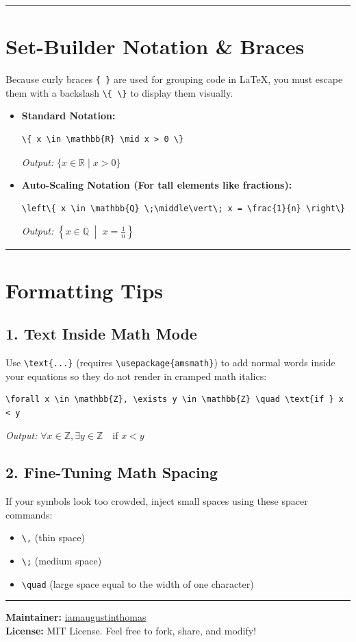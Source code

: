 \documentclass[11pt]{article}
\begin{document}
\vspace{1em}
\noindent\rule{\textwidth}{0.4pt}

\section*{\textbf{\Large Set-Builder Notation \& Braces}}
Because curly braces \verb|{ }| are used for grouping code in \LaTeX{}, you must escape them with a backslash \verb|\{ \}| to display them visually.

\begin{itemize}
    \item \textbf{Standard Notation:}
\begin{verbatim}
\{ x \in \mathbb{R} \mid x > 0 \}
\end{verbatim}
    \textit{Output:} $\{ x \in \mathbb{R} \mid x > 0 \}$

    \item \textbf{Auto-Scaling Notation (For tall elements like fractions):}
\begin{verbatim}
\left\{ x \in \mathbb{Q} \;\middle\vert\; x = \frac{1}{n} \right\}
\end{verbatim}
    \textit{Output:} $\left\{ x \in \mathbb{Q} \;\middle\vert\; x = \frac{1}{n} \right\}$
\end{itemize}

\vspace{1em}
\noindent\rule{\textwidth}{0.4pt}

\section*{\textbf{\Large Formatting Tips}}

\subsection*{1. Text Inside Math Mode}
Use \verb|\text{...}| (requires \verb|\usepackage{amsmath}|) to add normal words inside your equations so they do not render in cramped math italics:
\begin{verbatim}
\forall x \in \mathbb{Z}, \exists y \in \mathbb{Z} \quad \text{if } x < y
\end{verbatim}
\textit{Output:} $\forall x \in \mathbb{Z}, \exists y \in \mathbb{Z} \quad \text{if } x < y$

\subsection*{2. Fine-Tuning Math Spacing}
If your symbols look too crowded, inject small spaces using these spacer commands:
\begin{itemize}
    \item \verb|\,| (thin space)
    \item \verb|\;| (medium space)
    \item \verb|\quad| (large space equal to the width of one character)
\end{itemize}

\vspace{1em}
\noindent\rule{\textwidth}{0.4pt}

\vspace{1em}
\noindent \textbf{Maintainer:} \href{https://github.com/iamaugustinthomas}{iamaugustinthomas} \\
\textbf{License:} MIT License. Feel free to fork, share, and modify!
\end{document}
